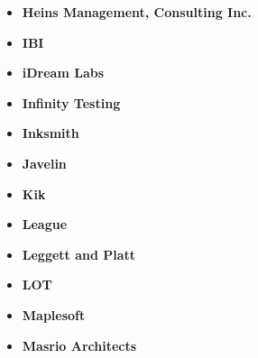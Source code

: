 \documentclass[main.tex]{subfiles}
\begin{document}
\begin{flushleft}
\begin{multicols}{3}
\begin{itemize}[label={},noitemsep]
    \item \textbf{Heins Management, Consulting Inc.}
    \end{itemize}
    \columnbreak
    \begin{itemize}[label={},noitemsep]
    \item \textbf{IBI}
    \end{itemize}
    \columnbreak
    \begin{itemize}[label={},noitemsep]
    \item \textbf{iDream Labs}
    \end{itemize}
    \columnbreak
\end{multicols}

\begin{multicols}{3}
\begin{itemize}[label={},noitemsep]
    \item \textbf{Infinity Testing}
    \end{itemize}
    \columnbreak
    \begin{itemize}[label={},noitemsep]
    \item \textbf{Inksmith}
    \end{itemize}
    \columnbreak
    \begin{itemize}[label={},noitemsep]
    \item \textbf{Javelin}
    \end{itemize}
    \columnbreak
\end{multicols}

\begin{multicols}{3}
\begin{itemize}[label={},noitemsep]
    \item \textbf{Kik}
    \end{itemize}
    \columnbreak
    \begin{itemize}[label={},noitemsep]
    \item \textbf{League}
    \end{itemize}
    \columnbreak
    \begin{itemize}[label={},noitemsep]
    \item \textbf{Leggett and Platt}
    \end{itemize}
    \columnbreak
\end{multicols}

\begin{multicols}{3}
\begin{itemize}[label={},noitemsep]
    \item \textbf{LOT}
    \end{itemize}
    \columnbreak
    \begin{itemize}[label={},noitemsep]
    \item \textbf{Maplesoft}
    \end{itemize}
    \columnbreak
    \begin{itemize}[label={},noitemsep]
    \item \textbf{Masrio Architects}
    \end{itemize}
    \columnbreak
\end{multicols}


\end{flushleft}
\end{document}
